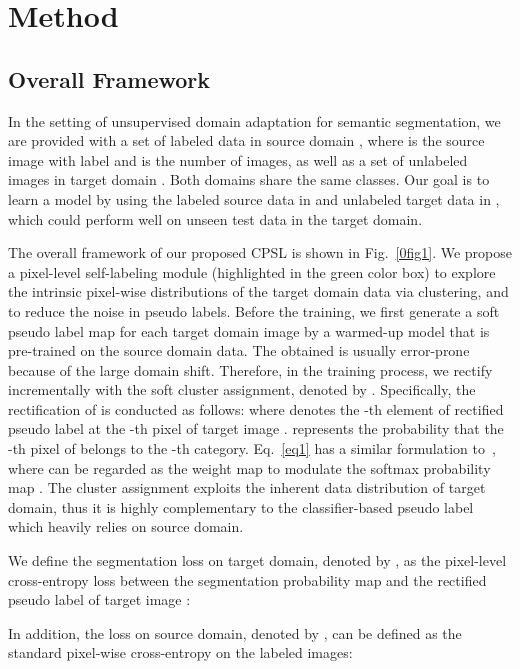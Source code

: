\documentclass[10pt,twocolumn,letterpaper]{article}
\begin{document}
\section{Method}
	\subsection{Overall Framework}
	\label{sec3.1}
	In the setting of unsupervised domain adaptation for semantic segmentation, we are provided with a set of labeled data in source domain , where  is the source image with label  and  is the number of images, as well as a set of  unlabeled images  in target domain . Both domains share the same  classes. Our goal is to learn a model by using the labeled source data in  and unlabeled target data in , which could perform well on unseen test data in the target domain.
	
	The overall framework of our proposed CPSL is shown in Fig.~\ref{0fig1}. We propose a pixel-level self-labeling module (highlighted in the green color box) to explore the intrinsic pixel-wise distributions of the target domain data via clustering, and to reduce the noise in pseudo labels. Before the training, we first generate a soft pseudo label map  for each target domain image by a warmed-up model that is pre-trained on the source domain data. The obtained  is usually error-prone because of the large domain shift. Therefore, in the training process, we rectify  incrementally with the soft cluster assignment, denoted by . Specifically, the rectification of  is conducted as follows:
{\small 	}where  denotes the -th element of rectified pseudo label at the -th pixel of target image .  represents the probability that the -th pixel of  belongs to the -th category. Eq.~\ref{eq1} has a similar formulation to~\cite{qi2018low,snell2017prototypical,zhang2021prototypical}, where  can be regarded as the weight map to modulate the softmax probability map . The cluster assignment  exploits the inherent data distribution of target domain, thus it is highly complementary to the classifier-based pseudo label  which heavily relies on source domain.
	
	We define the segmentation loss on target domain, denoted by , as the pixel-level cross-entropy loss between the segmentation probability map  and the rectified pseudo label  of target image :
   
In addition, the loss on source domain, denoted by , can be defined as the standard pixel-wise cross-entropy on the labeled images:
	
\end{document}
